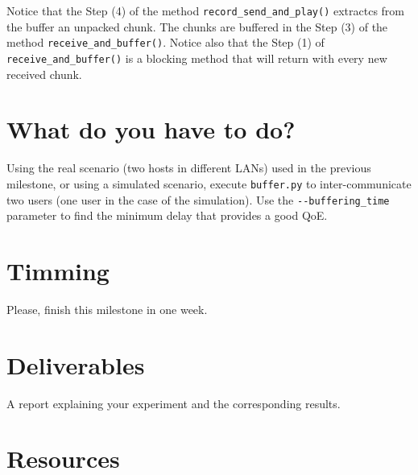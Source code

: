 Notice that the Step (4) of the method \verb|record_send_and_play()|
extractcs from the buffer an unpacked chunk. The chunks are buffered
in the Step (3) of the method \verb|receive_and_buffer()|. Notice also
that the Step (1) of \verb|receive_and_buffer()| is a blocking method
that will return with every new received chunk.


\section{What do you have to do?}

Using the real scenario (two hosts in different LANs) used in the
previous milestone, or using a simulated scenario, execute
\verb|buffer.py| to inter-communicate two users (one user in the case
of the simulation). Use the \verb|--buffering_time| parameter to find
the minimum delay that provides a good QoE.

\section{Timming}

Please, finish this milestone in one week.

\section{Deliverables}

A report explaining your experiment and the corresponding results.

\section{Resources}



